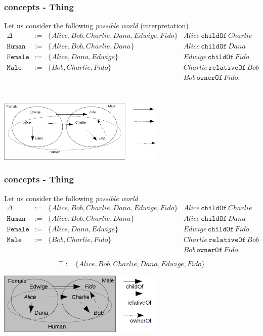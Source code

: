 \documentclass[8pt]{beamer}
\newcommand{\Human}{\mathtt{Human}}
\newcommand{\Male}{\mathtt{Male}}
\newcommand{\Female}{\mathtt{Female}}
\newcommand{\relative}{\mathtt{relativeOf}}
\newcommand{\child}{\mathtt{childOf}}
\newcommand{\owner}{\mathtt{ownerOf}}
\newcommand{\Alice}{Alice}
\newcommand{\Bob}{Bob}
\newcommand{\Charlie}{Charlie}
\newcommand{\Dana}{Dana}
\newcommand{\Edwige}{Edwige}
\newcommand{\Fido}{Fido}
\begin{document}
\begin{frame}
 \frametitle{\elplusplus concepts - Thing}
 Let us consider the following \emph{possible world} (interpretation)
 \[
 \begin{array}{rcl|l}
  \Delta & := & \{ \Alice, \Bob, \Charlie, \Dana, \Edwige, \Fido \} & \Alice\,\child\,\Charlie \\
  \Human & := & \{ \Alice, \Bob, \Charlie, \Dana \} & \Alice\,\child\,\Dana\\
  \Female & := & \{ \Alice, \Dana, \Edwige \} & \Edwige\,\child\,\Fido\\
  \Male & := & \{ \Bob, \Charlie, \Fido \} & \Charlie\,\relative\,\Bob \\
  & & & \Bob\,\owner\,\Fido .
 \end{array}
\]

\[
 \phantom{\top := \{ \Alice, \Bob, \Charlie, \Dana, \Edwige, \Fido \}}
\]

 \begin{center}
  \includegraphics[width=300px, keepaspectratio]{images/exbase_big.png}  
 \end{center}
\end{frame}

\begin{frame}
 \frametitle{\elplusplus concepts - Thing}
 Let us consider the following \emph{possible world}
 \[
 \begin{array}{rcl|l}
  \Delta & := & \{ \Alice, \Bob, \Charlie, \Dana, \Edwige, \Fido \} & \Alice\,\child\,\Charlie \\
  \Human & := & \{ \Alice, \Bob, \Charlie, \Dana \} & \Alice\,\child\,\Dana\\
  \Female & := & \{ \Alice, \Dana, \Edwige \} & \Edwige\,\child\,\Fido\\
  \Male & := & \{ \Bob, \Charlie, \Fido \} & \Charlie\,\relative\,\Bob \\
  & & & \Bob\,\owner\,\Fido .
 \end{array}
\]

\[
 \top := \{ \Alice, \Bob, \Charlie, \Dana, \Edwige, \Fido \}
\]

 \begin{center}
  \includegraphics[width=300px, keepaspectratio]{images/extop_big.png}  
 \end{center}
\end{frame}
\end{document}
